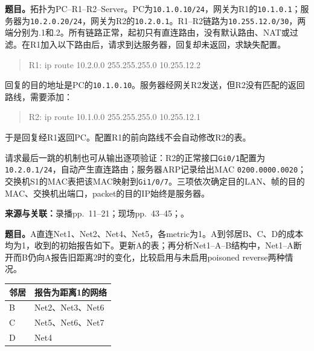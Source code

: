 \textbf{题目。}拓扑为PC--R1--R2--Server。PC为\texttt{10.1.0.10/24}，网关为R1的\texttt{10.1.0.1}；服务器为\texttt{10.2.0.20/24}，网关为R2的\texttt{10.2.0.1}。R1--R2链路为\texttt{10.255.12.0/30}，两端分别为.1和.2。所有链路正常，起初只有直连路由，没有默认路由、NAT或过滤。在R1加入以下路由后，请求到达服务器，回复却未返回，求缺失配置。

\begin{quote}\small\ttfamily
R1: ip route 10.2.0.0 255.255.255.0 10.255.12.2
\end{quote}

\begin{workedsolution}
回复的目的地址是PC的\texttt{10.1.0.10}。服务器经网关R2发送，但R2没有匹配的返回路线，需要添加：
\begin{quote}\small\ttfamily
R2: ip route 10.1.0.0 255.255.255.0 10.255.12.1
\end{quote}
于是回复经R1返回PC。配置R1的前向路线不会自动修改R2的表。

请求最后一跳的机制也可从输出逐项验证：R2的正常接口\texttt{Gi0/1}配置为\texttt{10.2.0.1/24}，自动产生直连路由；服务器ARP记录给出MAC \texttt{0200.0000.0020}；交换机S1的MAC表把该MAC映射到\texttt{Gi1/0/7}。三项依次确定目的LAN、帧的目的MAC、交换机出端口，packet的目的IP始终是服务器。
\end{workedsolution}


\textbf{来源与关联：}录播pp.~11--21；现场pp.~43--45；。

\textbf{题目。}A直连Net1、Net2、Net4、Net5，各metric为1。A到邻居B、C、D的成本均为1，收到的初始报告如下。更新A的表；再分析Net1--A--B结构中，Net1--A断开而B仍向A报告旧距离2时的变化，比较启用与未启用poisoned reverse两种情况。

\begin{center}
\small
\begin{tabular}{@{}ll@{}}
\toprule
邻居 & 报告为距离1的网络 \\
\midrule
B & Net2、Net3、Net6 \\
C & Net5、Net6、Net7 \\
D & Net4 \\
\bottomrule
\end{tabular}
\end{center}


